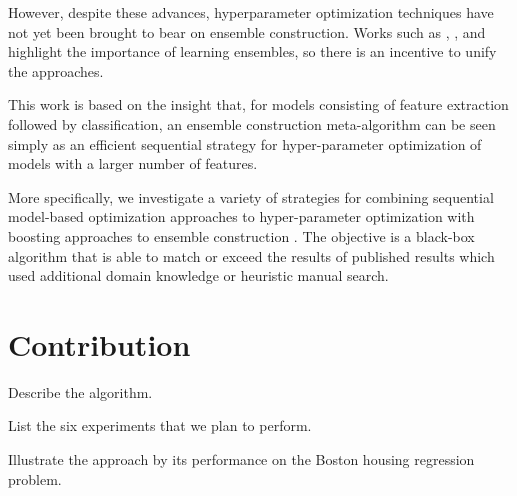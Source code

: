 \documentclass[11pt,twocolumn]{article}
\begin{document}
\vspace{11pt}
However, despite these advances, hyperparameter optimization techniques have not
yet been brought to bear on ensemble construction.  Works such as
\cite{gehler+nowozin:2009}, \cite{coates+lee+ng:2011},
and \cite{pinto+cox:2011} highlight the importance of learning ensembles, so there is an incentive
to unify the approaches.

\vspace{11pt}
This work is based on the insight that, for models consisting of feature extraction followed by classification,
an ensemble construction meta-algorithm can be seen simply as an
efficient sequential strategy for hyper-parameter optimization of
models with a larger number of features.

\vspace{11pt}
More specifically, we investigate a variety of strategies for combining sequential model-based
optimization approaches to hyper-parameter optimization with boosting
approaches to ensemble construction \cite{mason+baxter+bartlett+fraen:1999,
friedman:1999}.
The objective is a black-box algorithm that is able to match or exceed the
results of published results which used additional domain knowledge or
heuristic manual search.

\section{Contribution}

Describe the algorithm.

List the six experiments that we plan to perform.

Illustrate the approach by its performance on the Boston housing regression problem.

\small


\end{document}
